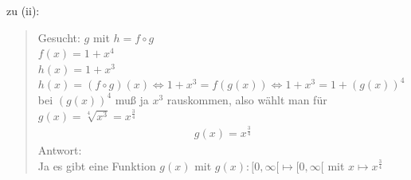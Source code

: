 zu (ii):\\
\begin{quote}
	Gesucht: $g$ mit $h=f\circ g$\\
	$f(x)=1+x^4$\\
	$h(x)=1+x^3$\\
	$h(x)=(f\circ g)(x)\Leftrightarrow 1+x^3=f(g(x))\Leftrightarrow 1+x^3=1+(g(x))^4$\\
	bei $(g(x))^4$ muß ja $x^3$ rauskommen, also wählt man für $g(x)=\sqrt[4]{x^3}=x^{\frac{3}{4}}$\\
	\begin{align*}
		g(x)=x^{\frac{3}{4}}
	\end{align*}
	Antwort: \\Ja es gibt eine Funktion $g(x)$ mit $g(x):[0,\infty[\longmapsto[0,\infty[$ mit $x\longmapsto x^{\frac{3}{4}}$
\end{quote}


